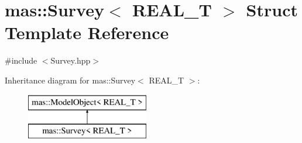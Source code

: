 \hypertarget{structmas_1_1_survey}{\section{mas\-:\-:Survey$<$ R\-E\-A\-L\-\_\-\-T $>$ Struct Template Reference}
\label{structmas_1_1_survey}
}


{\ttfamily \#include $<$Survey.\-hpp$>$}

Inheritance diagram for mas\-:\-:Survey$<$ R\-E\-A\-L\-\_\-\-T $>$\-:\begin{figure}[H]
\begin{center}
\leavevmode
\includegraphics[height=2.000000cm]{structmas_1_1_survey}
\end{center}
\end{figure}
